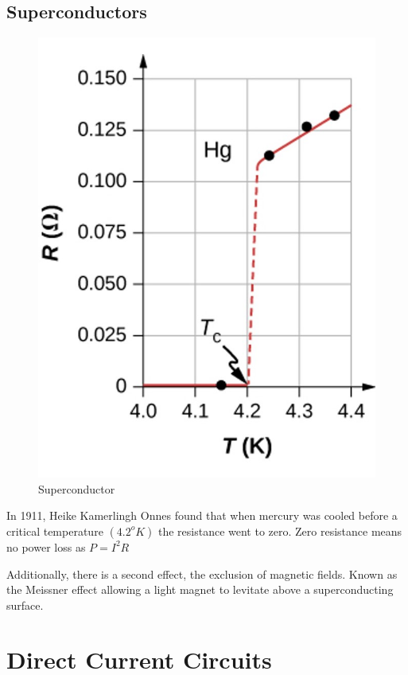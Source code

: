 \documentclass[14pt]{memoir}
\begin{document}
\section{Superconductors}

\begin{figure}[H]
\begin{center}
\includegraphics[scale=0.50]{fig/fig_09_27.jpg}
\caption{Superconductor}
\label{fig:09_27}
\end{center}
\end{figure}

In 1911, Heike Kamerlingh Onnes found that when mercury was cooled before a critical temperature $(4.2^o K)$ the resistance went to zero. Zero resistance means no power loss as $P = I^2R$

Additionally, there is a second effect, the exclusion of magnetic fields. Known as the Meissner effect allowing a light magnet to levitate above a superconducting surface. 

\chapter{Direct Current Circuits}
\end{document}

